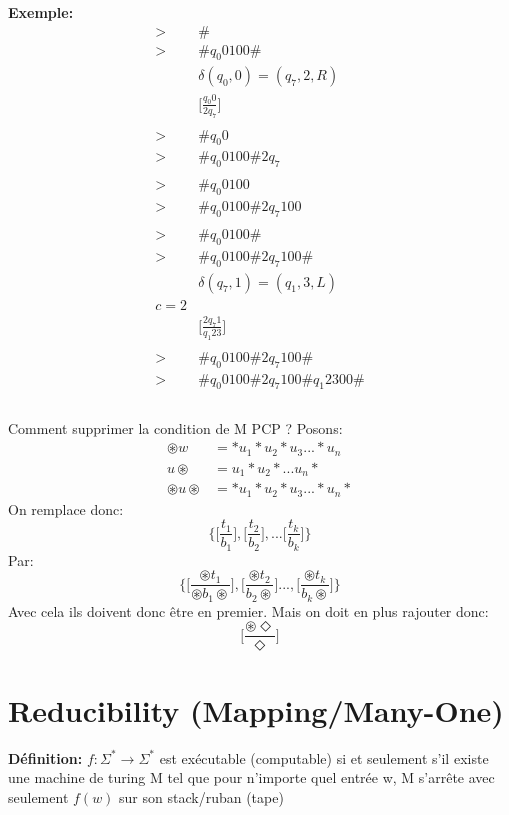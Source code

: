 \documentclass[a4paper,12pt]{article}
\begin{document}
  \textbf{Exemple:}
  \begin{align*}
    > &\#\\
    > &\# q_0 0 1 0 0 \#\\
    &\delta(q_0, 0) = (q_7, 2, R)\\
    &\Big[\frac{q_0 0}{2 q_7}\Big]\\
    &\\
    > &\# q_0 0\\
    > &\# q_0 0 1 0 0 \# 2 q_7\\
    &\\
    > &\# q_0 0 1 0 0\\
    > &\# q_0 0 1 0 0 \# 2 q_7 1 0 0 \\
    &\\
    > &\# q_0 0 1 0 0 \#\\
    > &\# q_0 0 1 0 0 \# 2 q_7 1 0 0 \#\\
    &\delta(q_7, 1) = (q_1, 3, L)\\
    c= 2\\
    &\Big[\frac{2 q_7 1}{q_1 2 3}\Big]\\
    &\\
    > &\# q_0 0 1 0 0 \# 2 q_7 1 0 0 \#\\
    > &\# q_0 0 1 0 0 \# 2 q_7 1 0 0 \# q_1 2 3 0 0 \# \\
    &\\
  \end{align*}
  
  Comment supprimer la condition de M PCP ?  Posons:
  \begin{align*}
    \circledast w &= * u_1 * u_2 * u_3 ... * u_n\\
    u \circledast &= u_1 * u_2 * ... u_n *\\
    \circledast u \circledast &= * u_1 * u_2 * u_3 ... * u_n *
  \end{align*}
  On remplace donc:
  $$\Bigg\{ \Big[\frac{t_1}{b_1}\Big] , \Big[\frac{t_2}{b_2}\Big], ... \Big[\frac{t_k}{b_k}\Big] \Bigg\}$$
  Par:
  $$\Bigg\{ \Big[\frac{\circledast t_1}{\circledast b_1 \circledast}\Big], \Big[\frac{\circledast t_2}{b_2 \circledast}\Big] ..., \Big[\frac{\circledast t_k}{b_k \circledast}\Big] \Bigg\}$$
  Avec cela ils doivent donc être en premier.  Mais on doit en plus rajouter donc:
  $$\Big[ \frac{\circledast \Diamond}{\Diamond} \Big]$$
  
  
\section{Reducibility (Mapping/Many-One)}
  \textbf{Définition:} $f : \Sigma^* \rightarrow \Sigma^*$ est exécutable (computable) si et seulement s'il existe une machine de turing M tel que pour n'importe quel entrée w, M s'arrête avec seulement $f(w)$ sur son stack/ruban (tape)\\
  
\end{document}

